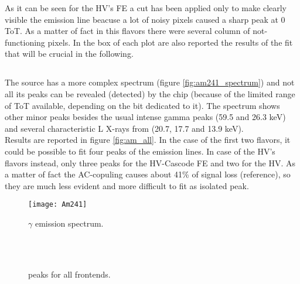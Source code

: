 As it can be seen for the HV's FE a cut has been applied only to make clearly visible the emission line beacuse a lot of noisy pixels caused a sharp peak at 0 ToT. As a matter of fact in this flavors there were several column of not-functioning pixels. In the box of each plot are also reported the results of the fit that will be crucial in the following.


\subsection{}


The  source has a more complex spectrum (figure \vref{fig:am241_spectrum}) and not all its peaks can be revealed (detected) by the chip (because of the limited range of ToT available, depending on the bit dedicated to it). The spectrum shows other minor peaks besides the usual intense gamma peaks (59.5 and 26.3 keV) and several characteristic L X-rays from  (20.7, 17.7 and 13.9 keV).\\ 
Results are reported in figure \vref{fig:am_all}. In the case of the first two flavors, it could be possible to fit four peaks of the emission lines. In case of the HV's flavors instead, only three peaks for the HV-Cascode FE and two for the HV. As a matter of fact the AC-copuling causes about 41\% of signal loss (reference), so they are much less evident and more difficult to fit as isolated peak.

\begin{figure}[h!]
\centering
\texttt{[image: Am241]}
\caption{ $\gamma$ emission spectrum.}
\label{fig:am241_spectrum}
\end{figure}


\begin{figure}[h!]
\centering
{}\quad
{}\\
\quad
{}\\
\caption{ peaks for all frontends.}
\label{fig:am_all}
\end{figure}


